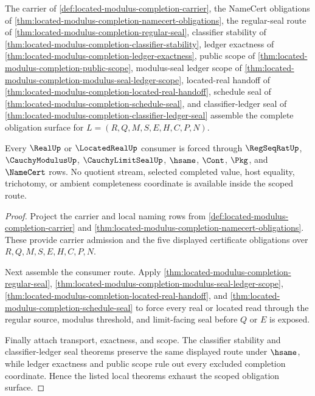 \begin{theorem}
\label{thm:located-modulus-completion-scoped-route-closure}
The carrier of \autoref{def:located-modulus-completion-carrier}, the NameCert obligations of \autoref{thm:located-modulus-completion-namecert-obligations}, the regular-seal route of \autoref{thm:located-modulus-completion-regular-seal}, classifier stability of \autoref{thm:located-modulus-completion-classifier-stability}, ledger exactness of \autoref{thm:located-modulus-completion-ledger-exactness}, public scope of \autoref{thm:located-modulus-completion-public-scope}, modulus-seal ledger scope of \autoref{thm:located-modulus-completion-modulus-seal-ledger-scope}, located-real handoff of \autoref{thm:located-modulus-completion-located-real-handoff}, schedule seal of \autoref{thm:located-modulus-completion-schedule-seal}, and classifier-ledger seal of \autoref{thm:located-modulus-completion-classifier-ledger-seal} assemble the complete obligation surface for $L=(R,Q,M,S,E,H,C,P,N)$.

Every $\RealUp$ or $\LocatedRealUp$ consumer is forced through $\RegSeqRatUp$, $\CauchyModulusUp$, $\CauchyLimitSealUp$, $\hsame$, $\Cont$, $\Pkg$, and $\NameCert$ rows. No quotient stream, selected completed value, host equality, trichotomy, or ambient completeness coordinate is available inside the scoped route.
\end{theorem}
\begin{proof}
Project the carrier and local naming rows from \autoref{def:located-modulus-completion-carrier} and \autoref{thm:located-modulus-completion-namecert-obligations}. These provide carrier admission and the five displayed certificate obligations over $R,Q,M,S,E,H,C,P,N$.

Next assemble the consumer route. Apply \autoref{thm:located-modulus-completion-regular-seal}, \autoref{thm:located-modulus-completion-modulus-seal-ledger-scope}, \autoref{thm:located-modulus-completion-located-real-handoff}, and \autoref{thm:located-modulus-completion-schedule-seal} to force every real or located read through the regular source, modulus threshold, and limit-facing seal before $Q$ or $E$ is exposed.

Finally attach transport, exactness, and scope. The classifier stability and classifier-ledger seal theorems preserve the same displayed route under $\hsame$, while ledger exactness and public scope rule out every excluded completion coordinate. Hence the listed local theorems exhaust the scoped obligation surface.
\end{proof}

